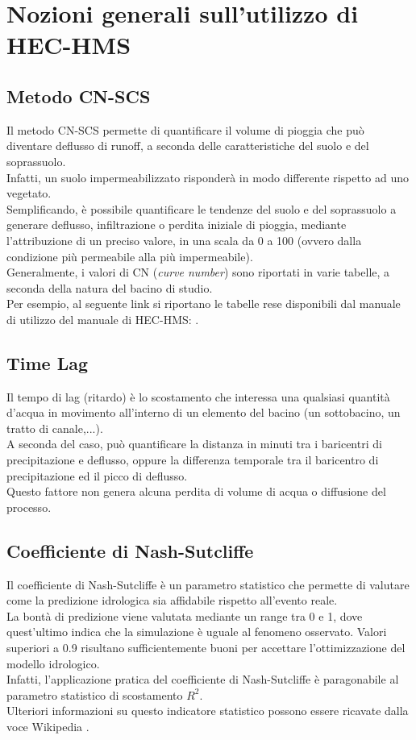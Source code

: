 \section{Nozioni generali sull'utilizzo di HEC-HMS}
\subsection{Metodo CN-SCS}
Il metodo CN-SCS permette di quantificare il volume di pioggia che può diventare deflusso di runoff, a seconda delle caratteristiche del suolo e del soprassuolo.\\
Infatti, un suolo impermeabilizzato risponderà in modo differente rispetto ad uno vegetato.\\
Semplificando, è possibile quantificare le tendenze del suolo e del soprassuolo a generare deflusso, infiltrazione o perdita iniziale di pioggia, mediante l'attribuzione di un preciso valore, in una scala da 0 a 100 (ovvero dalla condizione più permeabile alla più impermeabile).\\
Generalmente, i valori di CN (\textit{curve number}) sono riportati in varie tabelle, a seconda della natura del bacino di studio.\\
Per esempio, al seguente link si riportano le tabelle rese disponibili dal manuale di utilizzo del manuale di HEC-HMS: \cite{cn_tables_hec_hms}.

\subsection{Time Lag}
Il tempo di lag (ritardo) è lo scostamento che interessa una qualsiasi quantità d'acqua in movimento all'interno di un elemento del bacino (un sottobacino, un tratto di canale,...).\\
A seconda del caso, può quantificare la distanza in minuti tra i baricentri di precipitazione e deflusso, oppure la differenza temporale tra il baricentro di precipitazione ed il picco di deflusso.\\
Questo fattore non genera alcuna perdita di volume di acqua o diffusione del processo. 

\subsection{Coefficiente di Nash-Sutcliffe}
Il coefficiente di Nash-Sutcliffe è un parametro statistico che permette di valutare come la predizione idrologica sia affidabile rispetto all'evento reale.\\
La bontà di predizione viene valutata mediante un range tra 0 e 1, dove quest'ultimo indica che la simulazione è uguale al fenomeno osservato. Valori superiori a 0.9 risultano sufficientemente buoni per accettare l'ottimizzazione del modello idrologico.\\
Infatti, l'applicazione pratica del coefficiente di Nash-Sutcliffe è paragonabile al parametro statistico di scostamento $R^2$.\\
Ulteriori informazioni su questo indicatore statistico possono essere ricavate dalla voce Wikipedia \cite{nash-sutcliffe}.